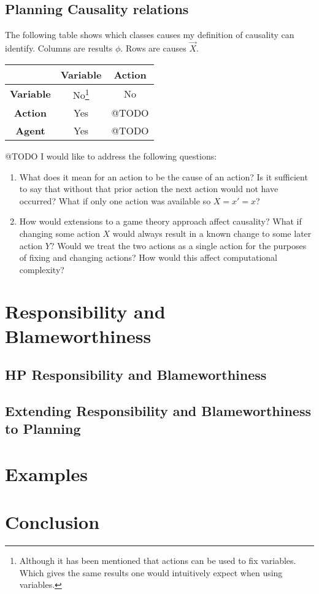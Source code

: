 \documentclass{article}
\theoremstyle{plain}
\theoremstyle{definition}
\begin{document}
\subsection{Planning Causality relations}

The following table shows which classes causes my definition of causality can identify. Columns are results $\phi$. Rows are causes $\vec{X}$.

\begin{center}
\begin{tabular}{ |c|c|c| }
\hline 
  & \textbf{Variable} & \textbf{Action} \\
 \hline 
 \textbf{Variable} & No\footnote{Although it has been mentioned that actions can be used to fix variables. Which gives the same results one would intuitively expect when using variables.} & No \\ 
 \hline
 \textbf{Action} & Yes & @TODO \\ 
 \hline
 \textbf{Agent} & Yes & @TODO\\
 \hline
\end{tabular}
\end{center}

@TODO I would like to address the following questions:

\begin{enumerate}
\item What does it mean for an action to be the cause of an action? Is it sufficient to say that without that prior action the next action would not have occurred? What if only one action was available so $X=x'=x$?
\item How would extensions to a game theory approach affect causality? What if changing some action $X$ would always result in a known change to some later action $Y$? Would we treat the two actions as a single action for the purposes of fixing and changing actions? How would this affect computational complexity?
\end{enumerate}



\section{Responsibility and Blameworthiness}
\subsection{HP Responsibility and Blameworthiness}
\subsection{Extending Responsibility and Blameworthiness to Planning}

\section{Examples}

\section{Conclusion}
\end{document}
